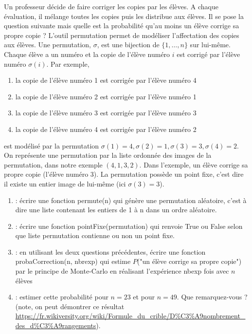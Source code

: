 \documentclass{book}
\begin{document}
\begin{Exercice}
Un professeur décide de faire corriger les copies par les élèves. A chaque évaluation, il mélange toutes les copies puis les distribue aux élèves. Il se pose la question suivante mais quelle est la probabilité qu'au moins un élève corrige sa propre copie ? 
L'outil permutation permet de modéliser l'affectation des copies aux élèves. Une permutation, $\sigma$, est une bijection de $\{1,\dots,n\}$ sur lui-même.  Chaque élève a un numéro et  la copie de l'élève numéro $i$ est corrigé par l'élève numéro $\sigma(i)$.  Par exemple, 
\begin{enumerate}
\item la copie de l'élève numéro 1 est corrigée par l'élève numéro 4
\item la copie de l'élève numéro 2 est corrigée par l'élève numéro 1
\item la copie de l'élève numéro 3 est corrigée par l'élève numéro 3
\item la copie de l'élève numéro 4 est corrigée par l'élève numéro 2
\end{enumerate}
est modélisé par la permutation  $\sigma(1)=4,\sigma(2)=1,\sigma(3)=3, \sigma(4)=2$. On représente une permutation par la liste ordonnée des images de la permutation, dans notre exemple $(4,1,3,2)$. Dans l'exemple, un élève corrige sa propre copie (l'élève numéro 3).  La permutation possède un point fixe, c'est dire il existe un  entier image de lui-même (ici $\sigma(3)=3$).  
\begin{enumerate}
\item {} : écrire une fonction permute(n) qui génère une permutation aléatoire, c'est à dire une liste contenant les entiers de 1 à n dans un ordre aléatoire.  
\item {} : écrire une fonction pointFixe(permutation)
qui renvoie True ou False selon que liste permutation contienne ou non un point fixe.
\item  {} : en utilisant les deux questions précédentes, écrire une fonction probaCorrection(n, nbrexp)
qui estime $P$("un élève corrige sa propre copie") par le principe de Monte-Carlo en réalisant l'expérience nbexp fois avec $n$ élèves
\item {} : estimer cette probabilité pour $n=23$ et pour $n=49$. Que remarquez-vous ?  (note, on peut démontrer ce résultat \url{https://fr.wikiversity.org/wiki/Formule_du_crible/D%C3%A9nombrement_des_d%C3%A9rangements}).
\end{enumerate}
\end{Exercice}
\end{document}
